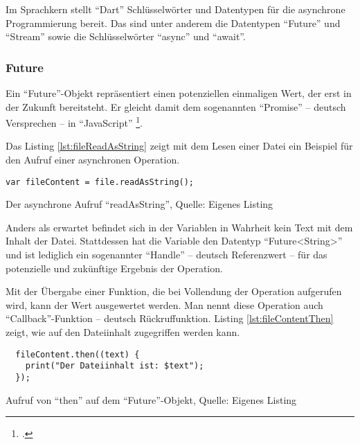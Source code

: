 Im Sprachkern stellt \enquote{Dart} Schlüsselwörter und Datentypen für die asynchrone Programmierung bereit.
Das sind unter anderem die Datentypen \enquote{Future} und \enquote{Stream} sowie die Schlüsselwörter \enquote{async} und \enquote{await}.

\subsubsection{Future}
Ein \enquote{Future}-Objekt repräsentiert einen potenziellen einmaligen Wert, der erst in der Zukunft bereitsteht.
Er gleicht damit dem sogenannten \enquote{Promise} -- deutsch Versprechen -- in \enquote{JavaScript}  \footcite[Vgl.][]{PromiseJavaScriptMDN}.

Das Listing \ref{lst:fileReadAsString} zeigt mit dem Lesen einer Datei ein Beispiel für den Aufruf einer asynchronen Operation.

\ifIncludeFigures
  \begin{listing}[ht]
    \begin{verbatim}
var fileContent = file.readAsString();
\end{verbatim}
    \caption[Der asynchrone Aufruf \enquote{readAsString}]{Der asynchrone Aufruf \enquote{readAsString}, Quelle: Eigenes Listing}
    \label{lst:fileReadAsString}
  \end{listing}
\fi

Anders als erwartet befindet sich in der Variablen  in Wahrheit kein Text mit dem Inhalt der Datei.
Stattdessen hat die Variable den Datentyp \enquote{Future<String>} und ist lediglich ein sogenannter \enquote{Handle}
-- deutsch Referenzwert --
für das potenzielle und zukünftige Ergebnis der Operation.

Mit der Übergabe einer Funktion, die bei Vollendung der Operation aufgerufen wird, kann der Wert ausgewertet werden.
Man nennt diese Operation auch \enquote{Callback}-Funktion -- deutsch Rückruffunktion.
Listing \ref{lst:fileContentThen}
zeigt, wie auf den Dateiinhalt zugegriffen werden kann.

\ifIncludeFigures
  \begin{listing}[ht]
    \begin{verbatim}
  fileContent.then((text) {
    print("Der Dateiinhalt ist: $text");
  });
\end{verbatim}
    \caption[Aufruf von \enquote{then} auf dem \enquote{Future}-Objekt]{Aufruf von \enquote{then} auf dem \enquote{Future}-Objekt, Quelle: Eigenes Listing}
    \label{lst:fileContentThen}
  \end{listing}
\fi

